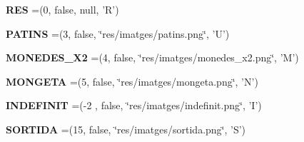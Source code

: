 \begin{DoxyCompactItemize}
\item 
\hypertarget{enumlogica_1_1enumeracions_1_1_e_element_a245e97fd082485340269d8ab61f2b755}{{\bfseries R\+E\+S} =(0, false, null, 'R')}\label{enumlogica_1_1enumeracions_1_1_e_element_a245e97fd082485340269d8ab61f2b755}

\item 
\hypertarget{enumlogica_1_1enumeracions_1_1_e_element_a0a61c21bfec5ae8800427056310419e3}{{\bfseries P\+A\+T\+I\+N\+S} =(3, false, \char`\"{}res/imatges/patins.\+png\char`\"{}, 'U')}\label{enumlogica_1_1enumeracions_1_1_e_element_a0a61c21bfec5ae8800427056310419e3}

\item 
\hypertarget{enumlogica_1_1enumeracions_1_1_e_element_a46992bac48ae51860eab0c0943396e3c}{{\bfseries M\+O\+N\+E\+D\+E\+S\+\_\+\+X2} =(4, false, \char`\"{}res/imatges/monedes\+\_\+x2.\+png\char`\"{}, 'M')}\label{enumlogica_1_1enumeracions_1_1_e_element_a46992bac48ae51860eab0c0943396e3c}

\item 
\hypertarget{enumlogica_1_1enumeracions_1_1_e_element_a1ecb0f7c24daddf0c76a31d6011d88aa}{{\bfseries M\+O\+N\+G\+E\+T\+A} =(5, false, \char`\"{}res/imatges/mongeta.\+png\char`\"{}, 'N')}\label{enumlogica_1_1enumeracions_1_1_e_element_a1ecb0f7c24daddf0c76a31d6011d88aa}

\item 
\hypertarget{enumlogica_1_1enumeracions_1_1_e_element_a662e4647d191a9df383e40bb61c5eb91}{{\bfseries I\+N\+D\+E\+F\+I\+N\+I\+T} =(-\/2 , false, \char`\"{}res/imatges/indefinit.\+png\char`\"{}, 'I')}\label{enumlogica_1_1enumeracions_1_1_e_element_a662e4647d191a9df383e40bb61c5eb91}

\item 
\hypertarget{enumlogica_1_1enumeracions_1_1_e_element_ae8aea2c8afbe63876761224cc6db55be}{{\bfseries S\+O\+R\+T\+I\+D\+A} =(15, false, \char`\"{}res/imatges/sortida.\+png\char`\"{}, 'S')}\label{enumlogica_1_1enumeracions_1_1_e_element_ae8aea2c8afbe63876761224cc6db55be}

\end{DoxyCompactItemize}
